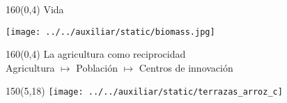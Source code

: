 \documentclass[shownotes,aspectratio=169]{beamer}
\begin{document}
\begin{frame}[plain]
\begin{textblock}{160}(0,4)
 \centering \LARGE
Vida
\end{textblock}
\vspace{1cm}
\texttt{[image: ../../auxiliar/static/biomass.jpg]}
\end{frame}

\begin{frame}[plain]
 \begin{textblock}{160}(0,4)
  \LARGE \centering La agricultura como reciprocidad\\
  \Large \textcolor{black!85}{Agricultura $\mapsto$ Población $\mapsto$ Centros de innovación }
 \end{textblock} 

\begin{textblock}{150}(5,18)
 \centering
 \texttt{[image: ../../auxiliar/static/terrazas\_arroz\_c]}
\end{textblock}

\end{frame}
\end{document}
